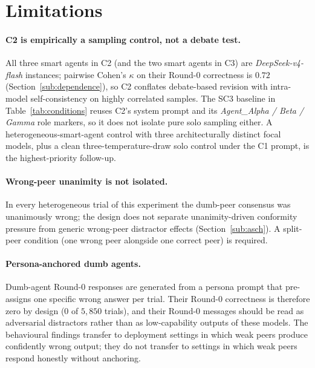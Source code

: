 \documentclass[review,3p,authoryear]{elsarticle}
\begin{document}
\section*{Limitations}
\label{sec:limitations}

\paragraph{C2 is empirically a sampling control, not a debate test.}
All three smart agents in C2 (and the two smart agents in C3) are
\textit{DeepSeek-v4-flash} instances; pairwise Cohen's $\kappa$ on
their Round-0 correctness is $0.72$ (Section~\ref{sub:dependence}),
so C2 conflates debate-based revision with intra-model
self-consistency on highly correlated samples.
The SC3 baseline in Table~\ref{tab:conditions} reuses C2's system
prompt and its \textit{Agent\_Alpha / Beta / Gamma} role markers, so
it does not isolate pure solo sampling either.
A heterogeneous-smart-agent control with three architecturally
distinct focal models, plus a clean three-temperature-draw solo
control under the C1 prompt, is the highest-priority follow-up.

\paragraph{Wrong-peer unanimity is not isolated.}
In every heterogeneous trial of this experiment the dumb-peer
consensus was unanimously wrong; the design does not separate
unanimity-driven conformity pressure from generic wrong-peer
distractor effects (Section~\ref{sub:asch}).
A split-peer condition (one wrong peer alongside one correct peer) is
required.

\paragraph{Persona-anchored dumb agents.}
Dumb-agent Round-0 responses are generated from a persona prompt that
pre-assigns one specific wrong answer per trial.
Their Round-0 correctness is therefore zero by design (0 of $5{,}850$
trials), and their Round-0 messages should be read as adversarial
distractors rather than as low-capability outputs of these models.
The behavioural findings transfer to deployment settings in which
weak peers produce confidently wrong output; they do not transfer to
settings in which weak peers respond honestly without anchoring.
\end{document}
